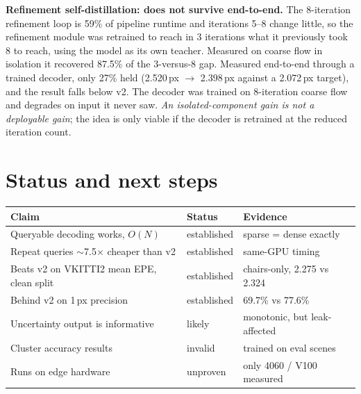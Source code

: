 \documentclass[11pt,a4paper]{article}
\begin{document}
\textbf{Refinement self-distillation: does not survive end-to-end.} The
8-iteration refinement loop is 59\% of pipeline runtime and iterations 5--8
change little, so the refinement module was retrained to reach in 3 iterations
what it previously took 8 to reach, using the model as its own teacher.
Measured on coarse flow in isolation it recovered 87.5\% of the 3-versus-8 gap.
Measured end-to-end through a trained decoder, only 27\% held (2.520\,px
$\rightarrow$ 2.398\,px against a 2.072\,px target), and the result falls below
v2. The decoder was trained on 8-iteration coarse flow and degrades on input it
never saw. \emph{An isolated-component gain is not a deployable gain}; the idea
is only viable if the decoder is retrained at the reduced iteration count.

\section{Status and next steps}

\begin{table}[!ht]
\centering
\small
\begin{tabular}{@{}lll@{}}
\toprule
Claim & Status & Evidence \\
\midrule
Queryable decoding works, $O(N)$          & established & sparse = dense exactly \\
Repeat queries $\sim$7.5$\times$ cheaper than v2 & established & same-GPU timing \\
Beats v2 on VKITTI2 mean EPE, clean split & established & chairs-only, 2.275 vs 2.324 \\
Behind v2 on 1\,px precision              & established & 69.7\% vs 77.6\% \\
Uncertainty output is informative         & likely      & monotonic, but leak-affected \\
Cluster accuracy results                  & \textcolor{bad}{invalid} & trained on eval scenes \\
Runs on edge hardware                     & unproven    & only 4060 / V100 measured \\
\bottomrule
\end{tabular}
\end{table}
\end{document}
